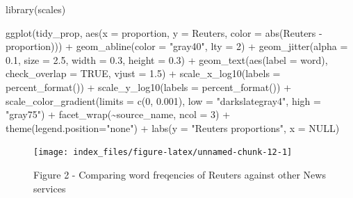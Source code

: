\documentclass[
]{article}
\newenvironment{Shaded}{\begin{snugshade}}{\end{snugshade}}
\newcommand{\AttributeTok}[1]{\textcolor[rgb]{0.77,0.63,0.00}{#1}}
\newcommand{\ConstantTok}[1]{\textcolor[rgb]{0.00,0.00,0.00}{#1}}
\newcommand{\DecValTok}[1]{\textcolor[rgb]{0.00,0.00,0.81}{#1}}
\newcommand{\FloatTok}[1]{\textcolor[rgb]{0.00,0.00,0.81}{#1}}
\newcommand{\FunctionTok}[1]{\textcolor[rgb]{0.00,0.00,0.00}{#1}}
\newcommand{\NormalTok}[1]{#1}
\newcommand{\SpecialCharTok}[1]{\textcolor[rgb]{0.00,0.00,0.00}{#1}}
\newcommand{\StringTok}[1]{\textcolor[rgb]{0.31,0.60,0.02}{#1}}
\begin{document}
\begin{Shaded}
\begin{Highlighting}[]
\FunctionTok{library}\NormalTok{(scales)}

\FunctionTok{ggplot}\NormalTok{(tidy\_prop, }\FunctionTok{aes}\NormalTok{(}\AttributeTok{x =}\NormalTok{ proportion, }\AttributeTok{y =} \StringTok{\textasciigrave{}}\AttributeTok{Reuters}\StringTok{\textasciigrave{}}\NormalTok{, }
                      \AttributeTok{color =} \FunctionTok{abs}\NormalTok{(}\StringTok{\textasciigrave{}}\AttributeTok{Reuters}\StringTok{\textasciigrave{}} \SpecialCharTok{{-}}\NormalTok{ proportion))) }\SpecialCharTok{+}
  \FunctionTok{geom\_abline}\NormalTok{(}\AttributeTok{color =} \StringTok{"gray40"}\NormalTok{, }\AttributeTok{lty =} \DecValTok{2}\NormalTok{) }\SpecialCharTok{+}
  \FunctionTok{geom\_jitter}\NormalTok{(}\AttributeTok{alpha =} \FloatTok{0.1}\NormalTok{, }\AttributeTok{size =} \FloatTok{2.5}\NormalTok{, }\AttributeTok{width =} \FloatTok{0.3}\NormalTok{, }\AttributeTok{height =} \FloatTok{0.3}\NormalTok{) }\SpecialCharTok{+}
  \FunctionTok{geom\_text}\NormalTok{(}\FunctionTok{aes}\NormalTok{(}\AttributeTok{label =}\NormalTok{ word), }\AttributeTok{check\_overlap =} \ConstantTok{TRUE}\NormalTok{, }\AttributeTok{vjust =} \FloatTok{1.5}\NormalTok{) }\SpecialCharTok{+}
  \FunctionTok{scale\_x\_log10}\NormalTok{(}\AttributeTok{labels =} \FunctionTok{percent\_format}\NormalTok{()) }\SpecialCharTok{+}
  \FunctionTok{scale\_y\_log10}\NormalTok{(}\AttributeTok{labels =} \FunctionTok{percent\_format}\NormalTok{()) }\SpecialCharTok{+}
  \FunctionTok{scale\_color\_gradient}\NormalTok{(}\AttributeTok{limits =} \FunctionTok{c}\NormalTok{(}\DecValTok{0}\NormalTok{, }\FloatTok{0.001}\NormalTok{), }
                       \AttributeTok{low =} \StringTok{"darkslategray4"}\NormalTok{, }\AttributeTok{high =} \StringTok{"gray75"}\NormalTok{) }\SpecialCharTok{+}
  \FunctionTok{facet\_wrap}\NormalTok{(}\SpecialCharTok{\textasciitilde{}}\NormalTok{source\_name, }\AttributeTok{ncol =} \DecValTok{3}\NormalTok{) }\SpecialCharTok{+}
  \FunctionTok{theme}\NormalTok{(}\AttributeTok{legend.position=}\StringTok{"none"}\NormalTok{) }\SpecialCharTok{+}
  \FunctionTok{labs}\NormalTok{(}\AttributeTok{y =} \StringTok{"Reuters proportions"}\NormalTok{, }\AttributeTok{x =} \ConstantTok{NULL}\NormalTok{)}
\end{Highlighting}
\end{Shaded}

\begin{figure}

{\centering \texttt{[image: index\_files/figure-latex/unnamed-chunk-12-1]} 

}

\caption{Figure 2 - Comparing word freqencies of Reuters against other News services}\label{fig:unnamed-chunk-12}
\end{figure}
\end{document}
